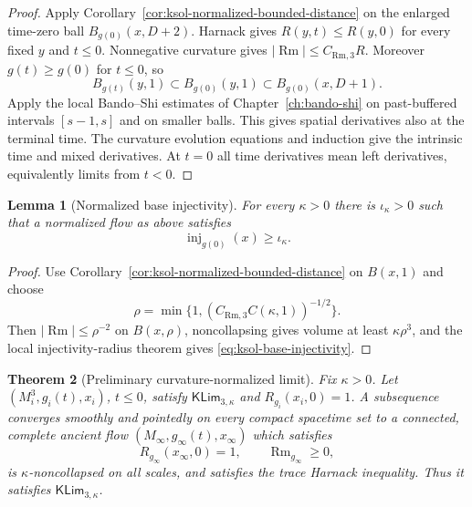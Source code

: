 \documentclass[10pt]{coll-l}
\newcommand{\inj}{\operatorname{inj}}
\newtheorem{theorem}{Theorem}[chapter]
\newtheorem{lemma}[theorem]{Lemma}
\theoremstyle{definition}
\theoremstyle{remark}
\numberwithin{section}{chapter}
\numberwithin{equation}{chapter}
\newcommand{\Rm}{\operatorname{Rm}}
\begin{document}
\begin{proof}
Apply Corollary~\ref{cor:ksol-normalized-bounded-distance} on the enlarged
time-zero ball $B_{g(0)}(x,D+2)$.  Harnack gives
$R(y,t)\leq R(y,0)$ for every fixed $y$ and $t\leq0$.  Nonnegative
curvature gives $|\Rm|\leq C_{\mathrm{Rm},3}R$.  Moreover
$g(t)\geq g(0)$ for $t\leq0$,
so
\[
 B_{g(t)}(y,1)\subset B_{g(0)}(y,1)
                    \subset B_{g(0)}(x,D+1).
\]
Apply the local Bando--Shi estimates of Chapter~\ref{ch:bando-shi} on
past-buffered intervals $[s-1,s]$ and on smaller balls.  This gives spatial
derivatives also at the terminal time.  The curvature evolution equations
and induction give the intrinsic time and mixed derivatives.  At $t=0$ all
time derivatives mean left derivatives, equivalently limits from $t<0$.
\end{proof}

\begin{lemma}[Normalized base injectivity]
\label{lem:ksol-normalized-injectivity}
For every $\kappa>0$ there is $\iota_\kappa>0$ such that a normalized flow
as above satisfies
\begin{equation}
                         \inj_{g(0)}(x)\geq\iota_\kappa.        \label{eq:ksol-base-injectivity}
\end{equation}
\end{lemma}

\begin{proof}
Use Corollary~\ref{cor:ksol-normalized-bounded-distance} on $B(x,1)$ and
choose
\[
 \rho=\min\{1,(C_{\mathrm{Rm},3}C(\kappa,1))^{-1/2}\}.
\]
Then $|\Rm|\leq\rho^{-2}$ on $B(x,\rho)$, noncollapsing gives volume at
least $\kappa\rho^3$, and the local injectivity-radius theorem gives
\eqref{eq:ksol-base-injectivity}.
\end{proof}

\begin{theorem}[Preliminary curvature-normalized limit]
\label{thm:ksol-preliminary-compactness}
Fix $\kappa>0$.  Let $(M_i^3,g_i(t),x_i)$, $t\leq0$, satisfy
$\mathsf{KLim}_{3,\kappa}$ and $R_{g_i}(x_i,0)=1$.  A subsequence converges
smoothly and pointedly on every compact spacetime set to a connected,
complete ancient flow $(M_\infty,g_\infty(t),x_\infty)$ which satisfies
\begin{equation}
 R_{g_\infty}(x_\infty,0)=1,
 \qquad\Rm_{g_\infty}\geq0,                            \label{eq:ksol-preliminary-limit-data}
\end{equation}
is $\kappa$-noncollapsed on all scales, and satisfies the trace Harnack
inequality.  Thus it satisfies $\mathsf{KLim}_{3,\kappa}$.
\end{theorem}
\end{document}
